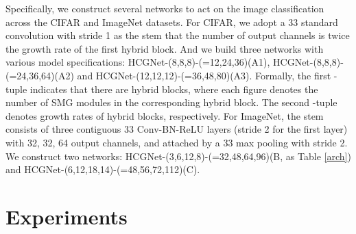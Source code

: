 \documentclass[letterpaper]{article}
\begin{document}
 	Specifically, we construct several networks to act on the image classification across the CIFAR and ImageNet datasets. For CIFAR, we adopt a 33 standard convolution with stride 1 as the stem that the number of output channels is twice the growth rate of the first hybrid block. And we build three networks with various model specifications: HCGNet-(8,8,8)-(=12,24,36)(A1), HCGNet-(8,8,8)-(=24,36,64)(A2) and HCGNet-(12,12,12)-(=36,48,80)(A3). Formally, the first -tuple indicates that there are  hybrid blocks, where each figure denotes the number of SMG modules in the corresponding hybrid block. The second -tuple denotes  growth rates of  hybrid blocks, respectively. For ImageNet, the stem consists of three contiguous 33 Conv-BN-ReLU layers (stride 2 for the first layer) with 32, 32, 64 output channels, and attached by a 33 max pooling with stride 2. We construct two networks: HCGNet-(3,6,12,8)-(=32,48,64,96)(B, as Table \ref{arch}) and HCGNet-(6,12,18,14)-(=48,56,72,112)(C).
 	
 	\section{Experiments}
\end{document}

